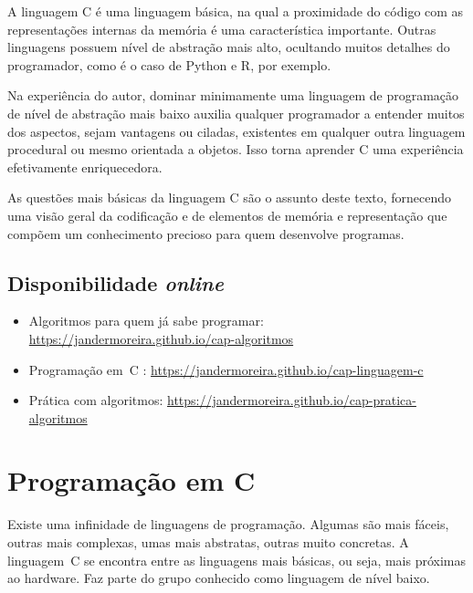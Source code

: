 \documentclass[
  11pt,
  a4paper,
]{scrbook}
\begin{document}

A linguagem C é uma linguagem básica, na qual a proximidade do código
com as representações internas da memória é uma característica
importante. Outras linguagens possuem nível de abstração mais alto,
ocultando muitos detalhes do programador, como é o caso de Python e R,
por exemplo.

Na experiência do autor, dominar minimamente uma linguagem de
programação de nível de abstração mais baixo auxilia qualquer
programador a entender muitos dos aspectos, sejam vantagens ou ciladas,
existentes em qualquer outra linguagem procedural ou mesmo orientada a
objetos. Isso torna aprender C uma experiência efetivamente
enriquecedora.

As questões mais básicas da linguagem C são o assunto deste texto,
fornecendo uma visão geral da codificação e de elementos de memória e
representação que compõem um conhecimento precioso para quem desenvolve
programas.

\section*{\texorpdfstring{Disponibilidade
\emph{online}}{Disponibilidade online}}\label{disponibilidade-online}


\begin{itemize}
\item
  Algoritmos para quem já sabe programar:
  \url{https://jandermoreira.github.io/cap-algoritmos}
\item
  Programação em~C :
  \url{https://jandermoreira.github.io/cap-linguagem-c}
\item
  Prática com algoritmos:
  \url{https://jandermoreira.github.io/cap-pratica-algoritmos}
\end{itemize}


\chapter*{Programação em C}\label{section}


Existe uma infinidade de linguagens de programação. Algumas são mais
fáceis, outras mais complexas, umas mais abstratas, outras muito
concretas. A linguagem~C se encontra entre as linguagens mais básicas,
ou seja, mais próximas ao hardware. Faz parte do grupo conhecido como
linguagem de nível baixo.
\end{document}
